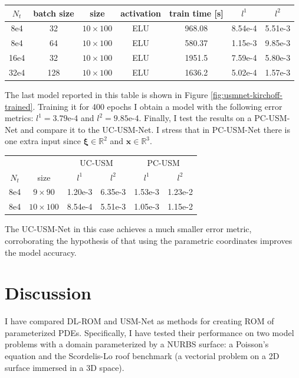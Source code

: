 \documentclass[11pt]{article}
\begin{document}
\begin{center}
\begin{tabular}{ c|c|c|c|c|c|c } 
 $N_t$ & batch size & size & activation & train time [s] & $l^1$ & $l^2$ \\ 
  \hline
 8e4 & 32 & $10 \times 100$ & ELU & 968.08 & 8.54e-4& 5.51e-3 \\
 8e4 & 64 & $10 \times 100$ & ELU & 580.37 & 1.15e-3&  9.85e-3 \\
 16e4 & 32 & $10 \times 100$ & ELU & 1951.5 & 7.59e-4&  5.80e-3 \\
 32e4 & 128 & $10 \times 100$ & ELU & 1636.2 & 5.02e-4&  1.57e-3 \\
 
\end{tabular}
\end{center}
The last model reported in this table is shown in Figure \ref{fig:usmnet-kirchoff-trained}. Training it for 400 epochs I obtain a model with the following error metrics: $l^1=3.79$e-4 and $l^2=9.85$e-4. Finally, I test the results on a PC-USM-Net and compare it to the UC-USM-Net. I stress that in PC-USM-Net there is one extra input since $\boldsymbol \xi \in \mathbb R^2$ and $\mathbf x \in \mathbb R^3$.

\begin{center}
\begin{tabular}{ |c|c|c|c|c|c| } 
 &&\multicolumn{2}{c|}{UC-USM} &\multicolumn{2}{c|}{PC-USM}\\
 $N_t$ & size & $l^1$ & $l^2$ & $l^1$ & $l^2$\\ 
 \hline
 8e4&$9 \times 90$  & 1.20e-3 & 6.35e-3 & 1.53e-3 & 1.23e-2 \\
 8e4&$10 \times 100$ & 8.54e-4 & 5.51e-3 & 1.05e-3 & 1.15e-2 \\
\end{tabular}
\end{center}


The UC-USM-Net in this case achieves a much smaller error metric, corroborating the hypothesis of \cite{regazzoni2022} that using the parametric coordinates improves the model accuracy.





\section{Discussion}\label{sec:discussion}
I have compared DL-ROM and USM-Net as methods for creating ROM of parameterized PDEs. Specifically, I have tested their performance on two model problems with a domain parameterized by a NURBS surface: a Poisson's equation and the Scordelis-Lo roof benchmark (a vectorial problem on a 2D surface immersed in a 3D space).
\end{document}
